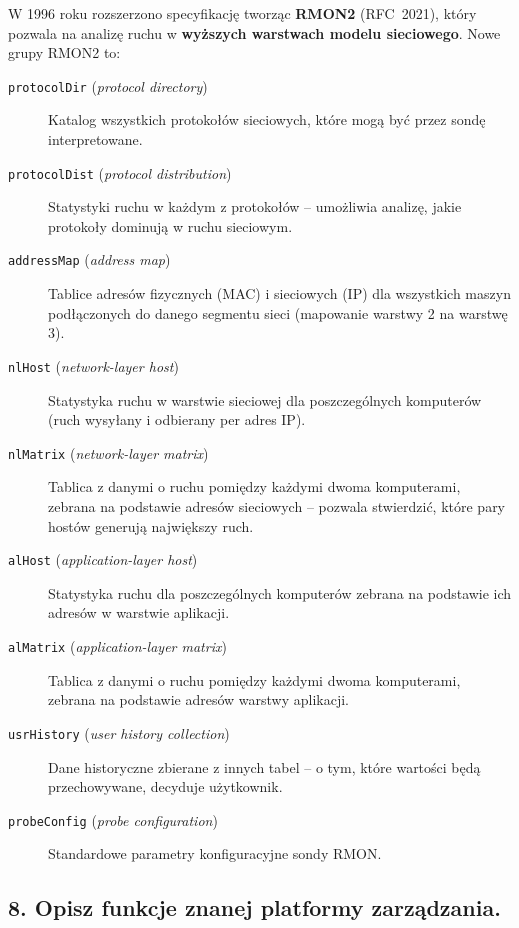 \documentclass[12pt,a4paper]{article}
\begin{document}
W 1996 roku rozszerzono specyfikację tworząc \textbf{RMON2} (RFC~2021), który
pozwala na analizę ruchu w \textbf{wyższych warstwach modelu sieciowego}.
Nowe grupy RMON2 to:

\begin{description}
  \item[\texttt{protocolDir} (\emph{protocol directory})]
        Katalog wszystkich protokołów sieciowych, które mogą być przez sondę
        interpretowane.
  \item[\texttt{protocolDist} (\emph{protocol distribution})]
        Statystyki ruchu w każdym z protokołów -- umożliwia analizę, jakie
        protokoły dominują w ruchu sieciowym.
  \item[\texttt{addressMap} (\emph{address map})]
        Tablice adresów fizycznych (MAC) i sieciowych (IP) dla wszystkich maszyn
        podłączonych do danego segmentu sieci (mapowanie warstwy 2 na warstwę 3).
  \item[\texttt{nlHost} (\emph{network-layer host})]
        Statystyka ruchu w warstwie sieciowej dla poszczególnych komputerów
        (ruch wysyłany i odbierany per adres IP).
  \item[\texttt{nlMatrix} (\emph{network-layer matrix})]
        Tablica z danymi o ruchu pomiędzy każdymi dwoma komputerami, zebrana
        na podstawie adresów sieciowych -- pozwala stwierdzić, które pary hostów
        generują największy ruch.
  \item[\texttt{alHost} (\emph{application-layer host})]
        Statystyka ruchu dla poszczególnych komputerów zebrana na podstawie ich
        adresów w warstwie aplikacji.
  \item[\texttt{alMatrix} (\emph{application-layer matrix})]
        Tablica z danymi o ruchu pomiędzy każdymi dwoma komputerami, zebrana
        na podstawie adresów warstwy aplikacji.
  \item[\texttt{usrHistory} (\emph{user history collection})]
        Dane historyczne zbierane z innych tabel -- o tym, które wartości będą
        przechowywane, decyduje użytkownik.
  \item[\texttt{probeConfig} (\emph{probe configuration})]
        Standardowe parametry konfiguracyjne sondy RMON.
\end{description}

\subsection*{8. Opisz funkcje znanej platformy zarządzania.}
\end{document}
